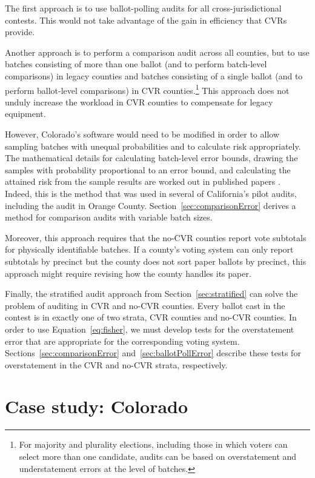 \documentclass[runningheads]{llncs}
\begin{document}
The first approach is to use ballot-polling audits for all cross-jurisdictional contests.
This would not take advantage of the gain in efficiency that CVRs provide.

Another approach is to perform a comparison audit across all counties, but to use batches consisting
of more than one ballot (and to perform batch-level comparisons)
in legacy counties and batches consisting of a single ballot (and to perform ballot-level comparisons) in CVR counties.\footnote{%
 For majority and plurality elections, including those in which voters can select more than one candidate,
  audits can be based on overstatement and understatement errors at the level of batches.
}
This approach does not unduly increase the workload in CVR counties
to compensate for legacy equipment.

However, Colorado's software would need to be modified in order to allow sampling batches with
unequal probabilities and to calculate risk appropriately.
The mathematical details for calculating
batch-level error bounds, drawing the samples with probability proportional to an
error bound, and calculating the attained risk from the sample results are worked out
in published papers \cite{stark09c,stark09b,stark10d}.
Indeed, this is the method that was used in several of California's pilot audits,
including the audit in Orange County.
Section~\ref{sec:comparisonError} derives a method for comparison audits with variable batch sizes.

Moreover, this approach requires that the no-CVR counties report vote subtotals
for physically identifiable batches.
If a county's voting system can only report subtotals by precinct but 
the county does not sort paper ballots by
precinct, this approach might require revising how the county handles its
paper.

Finally, the stratified audit approach from Section~\ref{sec:stratified} can solve the problem of auditing in CVR and no-CVR counties.
Every ballot cast in the contest is in exactly one of two strata, CVR counties and no-CVR counties. 
In order to use Equation~\ref{eq:fisher}, we must develop tests for the overstatement error that are appropriate for the
corresponding voting system.
Sections~\ref{sec:comparisonError} and~\ref{sec:ballotPollError} describe these tests for overstatement in the CVR and no-CVR strata,
respectively.






\section{Case study: Colorado}\label{sec:colorado}
\end{document}
